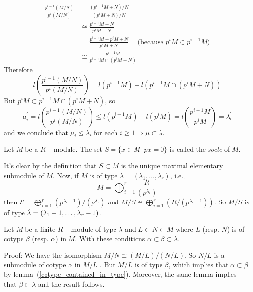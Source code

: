 \begin{equation}
    \begin{split}
        \frac{p^{i-1}(M/N)}{p^i(M/N)}&=\frac{(p^{i-1}M+N)/N}{(p^{i}M+N)/N}\\
        &\cong\frac{p^{i-1}M+N}{p^{i}M+N}\\
        &=\frac{p^{i-1}M+p^iM+N}{p^{i}M+N}\quad\text{ (because } p^iM\subset p^{i-1}M)\\
        &\cong\frac{p^{i-1}M}{p^{i-1}M\cap(p^{i}M+N)}
    \end{split}
\end{equation}
Therefore
\begin{equation}
    l\left( \frac{p^{i-1}(M/N)}{p^i(M/N)}\right) = l(p^{i-1}M)-l(p^{i-1}M\cap(p^{i}M+N))
\end{equation}
But $p^{i}M\subset p^{i-1}M\cap(p^{i}M+N)$, so 
\begin{equation}
     \mu_i^\prime= l\left( \frac{p^{i-1}(M/N)}{p^i(M/N)}\right) \leq l(p^{i-1}M)-l(p^{i}M)=l\left(\frac{p^{i-1}M}{p^{i}M}\right)=\lambda_i^\prime
\end{equation}
and we conclude that $\mu_i\leq\lambda_i$ for each $i\geq1\Rightarrow \mu\subset\lambda$.
\begin{dang}
    \begin{definition}\cite{macdonald1998symmetric}
        Let $M$ be a $R-$module. The set $S=\{x\in M|\;px=0\}$ is called the \textit{socle} of $M$.
    \end{definition}
\end{dang}
It's clear by the definition that $S\subset M$ is the unique maximal elementary submodule of $M$. Now, if $M$ is of type $\lambda=(\lambda_1,\dots,\lambda_r)$, i.e.,
\begin{equation}
    M=\bigoplus_{i=1}^r\frac{R}{(p^{\lambda_i})}
\end{equation}
then $S=\bigoplus_{i=1}^r(p^{\lambda_i-1})/(p^{\lambda_i})$ and $M/S\cong\bigoplus_{i=1}^r(R/(p^{\lambda_i-1}))$. So $M/S$ is of type $\Tilde{\lambda}=(\lambda_1-1,\dots,\lambda_r-1)$.
\begin{dang}
    \begin{lemma}\label{alpha subset beta subset lambda}\cite{macdonald1998symmetric}
        Let $M$ be a finite $R-$module of type $\lambda$ and $L\subset N\subset M$ where $L$ (resp. $N$) is of cotype $\beta$ (resp. $\alpha$) in $M$. With these conditions $\alpha\subset \beta\subset \lambda$.
    \end{lemma}
\end{dang}
Proof: We have the isomorphism $M/N\cong (M/L)/(N/L)$. So $N/L$ is a submodule of cotype $\alpha$ in $M/L$ . But $M/L$ is of type $\beta$, which implies that $\alpha\subset\beta$ by lemma~(\ref{cotype_contained_in_type}). Moreover, the same lemma implies that $\beta\subset\lambda$ and the result follows.
